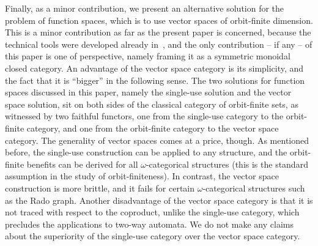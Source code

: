 Finally, as a minor contribution, we present an alternative solution for the problem of function spaces, which is  to use vector spaces of orbit-finite dimension. This is a minor contribution as far as the present paper is concerned, because the technical tools were developed already in~\cite{bojanczykKM21OrbitFiniteVector}, and the only contribution -- if any -- of this paper is one of perspective, namely framing it as a symmetric monoidal closed category. An advantage of the vector space category is its simplicity, and the fact that it is ``bigger'' in the following sense. The two solutions for function spaces discussed in this paper, namely the single-use solution and the vector space solution, sit on both sides of the classical category of orbit-finite sets, as witnessed by two faithful functors, one from the single-use category to the orbit-finite category, and one from the orbit-finite category to the vector space category. 
The generality of vector spaces comes at a price, though. As mentioned before, the single-use construction can be applied to any structure, and the orbit-finite benefits can be derived for all $\omega$-categorical structures (this is the standard assumption in the study of orbit-finiteness). In contrast, the vector space construction is more brittle, and it fails for certain $\omega$-categorical  structures such as the Rado graph.   Another disadvantage of the vector space category is that it is not traced with respect to the coproduct, unlike the single-use category, which precludes the applications to two-way automata. We do not make any claims about the superiority of the single-use category over the vector space category. 
